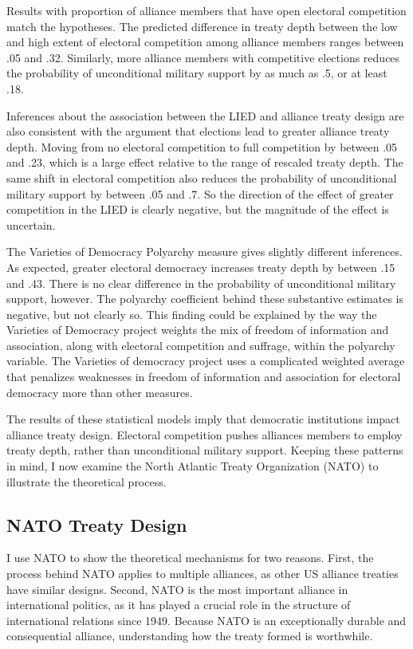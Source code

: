 \documentclass[12pt]{article}
\begin{document}
Results with proportion of alliance members that have open electoral competition match the hypotheses.  
The predicted difference in treaty depth between the low and high extent of electoral competition among alliance members ranges between .05 and .32.
Similarly, more alliance members with competitive elections reduces the probability of unconditional military support by as much as .5, or at least .18. 


Inferences about the association between the LIED and alliance treaty design are also consistent with the argument that elections lead to greater alliance treaty depth.
Moving from no electoral competition to full competition by between .05 and .23, which is a large effect relative to the range of rescaled treaty depth. 
The same shift in electoral competition also reduces the probability of unconditional military support by between .05 and .7. 
So the direction of the effect of greater competition in the LIED is clearly negative, but the magnitude of the effect is uncertain. 


The Varieties of Democracy Polyarchy measure gives slightly different inferences. 
As expected, greater electoral democracy increases treaty depth by between .15 and .43. 
There is no clear difference in the probability of unconditional military support, however.
The polyarchy coefficient behind these substantive estimates is negative, but not clearly so.  
This finding could be explained by the way the Varieties of Democracy project weights the mix of freedom of information and association, along with electoral competition and suffrage, within the polyarchy variable. 
The Varieties of democracy project uses a complicated weighted average that penalizes weaknesses in freedom of information and association for electoral democracy more than other measures. 


The results of these statistical models imply that democratic institutions impact alliance treaty design. 
Electoral competition pushes alliances members to employ treaty depth, rather than unconditional military support.  
Keeping these patterns in mind, I now examine the North Atlantic Treaty Organization (NATO) to illustrate the theoretical process. 


\subsection{NATO Treaty Design}


I use NATO to show the theoretical mechanisms for two reasons. 
First, the process behind NATO applies to multiple alliances, as other US alliance treaties have similar designs. 
Second, NATO is the most important alliance in international politics, as it has played a crucial role in the structure of international relations since 1949. 
Because NATO is an exceptionally durable and consequential alliance, understanding how the treaty formed is worthwhile. 
\end{document}
